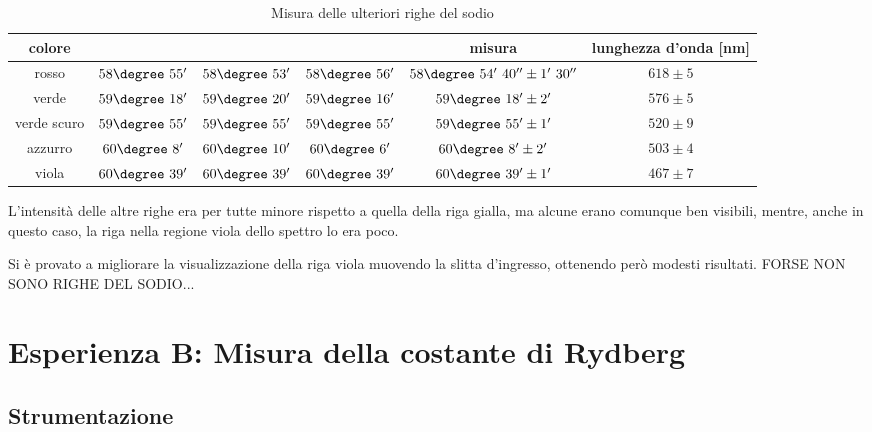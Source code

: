 \documentclass[a4paper,10pt]{article}
\begin{document}
{{{{{{\begin{table}[H]
	\centering
	\begin{tabular}{c|c|c|c|c|c}
		colore &	&	&	& misura & lunghezza d'onda [nm]\\
		\hline
		rosso &	$58\degree~55'$ & $58\degree~53'$ & $58\degree~56'$ & $58\degree~54'~40'' \pm 1'~30''$ & $618 \pm 5$\\
		verde & $59\degree~18'$ & $59\degree~20'$ & $59\degree~16'$ & $59\degree~18' \pm 2'$  & $576 \pm 5$\\
		verde scuro & $59\degree~55'$ & $59\degree~55'$ & $59\degree~55'$ & $59\degree~55' \pm 1'$ & $520 \pm 9$\\
		azzurro & $60\degree~8'$ & $60\degree~10'$ & $60\degree~6'$ & $60\degree~8' \pm 2'$& $503 \pm 4$\\
		viola & $60\degree~39'$ & $60\degree~39'$ & $60\degree~39'$ & $60\degree~39' \pm 1'$ & $467 \pm 7$\\	
	\end{tabular}
	\caption{Misura delle ulteriori righe del sodio}
	\label{tab:moreNa}
\end{table}

L'intensità delle altre righe era per tutte minore rispetto a quella della riga gialla, ma alcune erano comunque ben visibili, mentre, anche in questo caso, la riga nella regione viola dello spettro lo era poco.

Si è provato a migliorare la visualizzazione della riga viola muovendo la slitta d'ingresso, ottenendo però modesti risultati.
FORSE NON SONO RIGHE DEL SODIO...%

\section{Esperienza B: Misura della costante di Rydberg}

\subsection{Strumentazione}

}}}}}}
\end{document}
